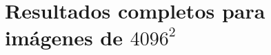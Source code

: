 \documentclass[12pt]{article}
\newcommand{\fuente}{\par\vspace{2pt}{\footnotesize Fuente: elaboración propia.}}
\begin{document}



\appendix
\section{Resultados completos para imágenes de $4096^2$}
\label{anexo}
\begin{table}[H]
\centering
\caption{Tiempo medio $\pm \sigma$ (30 repeticiones), speedup y eficiencia frente a la variante secuencial, imágenes de $4096^2$, kernels de $3\times3$ y $5\times5$.}
\label{tab:4096}
\small

\fuente
\end{table}

\begin{table}[H]
\centering
\caption{Tiempo medio $\pm \sigma$ (30 repeticiones), speedup y eficiencia frente a la variante secuencial, imágenes de $4096^2$, kernels de $7\times7$ y $11\times11$.}
\label{tab:4096b}
\small

\fuente
\end{table}
\end{document}
